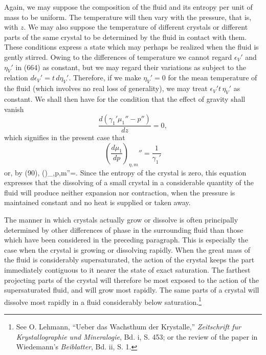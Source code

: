 \documentclass[12pt]{memoir}
\begin{document}
Again, we may suppose the composition of the fluid and its entropy per unit of mass to be uniform. The temperature will then vary with the pressure, that is, with $z$. We may also suppose the temperature of different crystals or different parts of the same crystal to be determined by the fluid in contact with them. These conditions express a state which may perhaps be realized when the fluid is gently stirred. Owing to the differences of temperature we cannot regard $\epsilon_V'$ and $\eta_V'$ in (664) as constant, but we may regard their variations as subject to the relation $d\epsilon_V'= t \,d\eta_V'$. Therefore, if we make $\eta_V' =0$ for the mean temperature of the fluid (which involves no real loss of generality), we may treat $\epsilon_V' t \,\eta_V'$ as constant. We shall then have for the condition that the effect of gravity shall vanish
$$ \frac{d(\gamma_1'\mu_1'' -p'' )}{dz}=0,$$
which signifies in the present case that
$$ \left(\frac{d\mu_1}{dp}\right)_{\eta,m}''=\frac{1}{\gamma_1'}$$
or, by (90),
\eqs \left(\right)_{\eta,p,m}''=.\label{670}\eqe
Since the entropy of the crystal is zero, this equation expresses that the dissolving of a small crystal in a considerable quantity of the fluid will produce neither expansion nor contraction, when the pressure is maintained constant and no heat is supplied or taken away.

The manner in which crystals actually grow or dissolve is often principally determined by other differences of phase in the surrounding fluid than those which have been considered in the preceding paragraph. This is especially the case when the crystal is growing or dissolving rapidly. When the great mass of the fluid is considerably supersaturated, the action of the crystal keeps the part immediately contiguous to it nearer the state of exact saturation. The farthest projecting parts of the crystal will therefore be most exposed to the action of the supersaturated fluid, and will grow most rapidly. The same parts of a crystal will dissolve most rapidly in a fluid considerably below saturation.\footnote{See O. Lehmann, ``Ueber das Wachsthum der Krystalle,'' \textit{Zeitschrift fur Krystallographie und Mineralogie}, Bd. i, S. 453; or the review of the paper in Wiedemann's \textit{Beiblatter}, Bd. ii, S. 1.}
\end{document}
